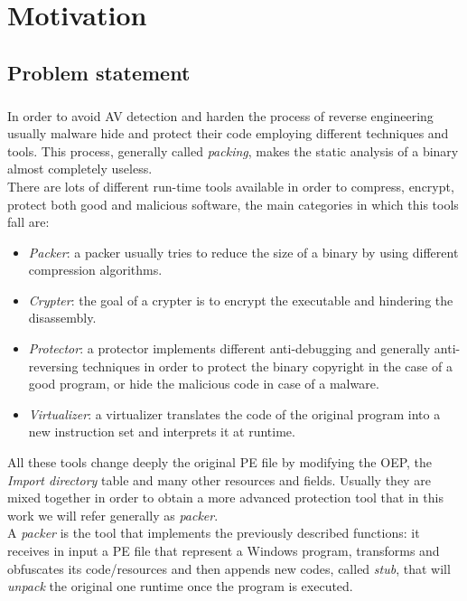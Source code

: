 \chapter{Motivation}
\label{chapter2}
\thispagestyle{empty}

\section{Problem statement}
\paragraph{}
In order to avoid \ac{AV} detection and harden the process of reverse engineering usually malware hide and protect their code employing different techniques and tools. This process, generally called \textit{packing}, makes the static analysis of a binary almost completely useless.\\
There are lots of different run-time tools available in order to compress, encrypt, protect both good and malicious software, the main categories in which this tools fall are:
\begin{itemize}
\item \emph{Packer}: a packer usually tries to reduce the size of a binary by using different compression algorithms.
\item \emph{Crypter}: the goal of a crypter is to encrypt the executable and hindering the disassembly.
\item \emph{Protector}: a protector implements different anti-debugging and generally anti-reversing techniques in order to protect the binary copyright in the case of a good program, or hide the malicious code in case of a malware.
\item \emph{Virtualizer}: a virtualizer translates the code of the original program into a new  instruction set and  interprets it at runtime.
\end{itemize}
All these tools change deeply the original \ac{PE} file by modifying the \ac{OEP}, the \textit{Import directory} table and many other resources and fields. Usually they are mixed together in order to obtain a more advanced protection tool that in this work we will refer generally as \textit{packer}.\\
A \textit{packer} is the tool that implements the previously described functions: it receives in input a \ac{PE} file that represent a Windows program, transforms and obfuscates its code/resources and then appends new codes, called \textit{stub}, that will \textit{unpack} the original one runtime once the program is executed.
